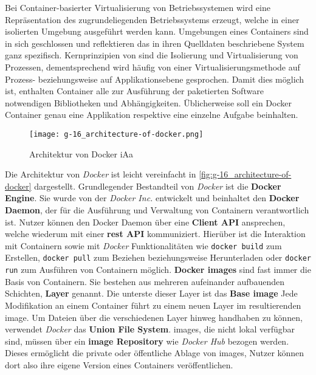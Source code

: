 Bei Container-basierter Virtualisierung von Betriebssystemen wird eine Repräsentation des zugrundeliegenden Betriebssystems erzeugt, welche in einer isolierten Umgebung ausgeführt werden kann. Umgebungen eines Containers sind in sich geschlossen und reflektieren das in ihren Quelldaten beschriebene System ganz spezifisch. Kernprinzipien von  sind die Isolierung und Virtualisierung von Prozessen, dementsprechend wird häufig von einer Virtualisierungsmethode auf Prozess- beziehungsweise auf Applikationsebene gesprochen. Damit dies möglich ist, enthalten Container alle zur Ausführung der paketierten Software notwendigen Bibliotheken und Abhängigkeiten. Üblicherweise soll ein Docker Container genau eine Applikation respektive eine einzelne Aufgabe beinhalten. \cite{014:Managing-Container-based-Software-Development-Environments}

\begin{figure}[h]
    \centering
    \texttt{[image: g-16\_architecture-of-docker.png]}
    \caption{Architektur von Docker \acrshort{iAa} \citeauthor{021:Docker-Security-Threat-Model-and-Best-Practices}}
    \label{fig:g-16_architecture-of-docker}
\end{figure}

Die Architektur von \textit{Docker} ist leicht vereinfacht in \autoref{fig:g-16_architecture-of-docker} dargestellt. Grundlegender Bestandteil von \textit{Docker} ist die \textbf{Docker Engine}. Sie wurde von der \textit{Docker Inc.} entwickelt und beinhaltet den \textbf{Docker Daemon}, der für die Ausführung und Verwaltung von Containern verantwortlich ist. Nutzer können den Docker Daemon über eine \textbf{Client API} ansprechen, welche wiederum mit einer \textbf{\Gls{rest} API} kommuniziert. Hierüber ist die Interaktion mit Containern sowie mit \textit{Docker} Funktionalitäten wie \texttt{docker build} zum Erstellen, \texttt{docker pull} zum Beziehen beziehungsweise Herunterladen oder \texttt{docker run} zum Ausführen von Containern möglich. \textbf{Docker \Glspl{image}} sind fast immer die Basis von Containern. Sie bestehen aus mehreren aufeinander aufbauenden Schichten, \textbf{Layer} genannt. Die unterste dieser Layer ist das \textbf{Base \Gls{image}} Jede Modifikation an einem Container führt zu einem neuen Layer im resultierenden \Gls{image}. Um Dateien über die verschiedenen Layer hinweg handhaben zu können, verwendet \textit{Docker} das \textbf{Union File System}. \Glspl{image}, die nicht lokal verfügbar sind, müssen über ein \textbf{\Gls{image} Repository} wie \textit{Docker Hub} bezogen werden. Dieses ermöglicht die private oder öffentliche Ablage von \Glspl{image}, Nutzer können dort also ihre eigene Version eines Containers veröffentlichen. \cite{021:Docker-Security-Threat-Model-and-Best-Practices}

